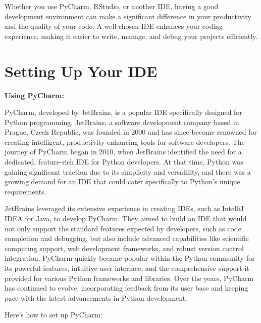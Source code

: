 \documentclass[
  letterpaper,
  DIV=11,
  numbers=noendperiod]{scrreprt}
\begin{document}
Whether you use PyCharm, RStudio, or another IDE, having a good
development environment can make a significant difference in your
productivity and the quality of your code. A well-chosen IDE enhances
your coding experience, making it easier to write, manage, and debug
your projects efficiently.

\hypertarget{setting-up-your-ide}{%
\section{Setting Up Your IDE}\label{setting-up-your-ide}}

\textbf{Using PyCharm:}

PyCharm, developed by JetBrains, is a popular IDE specifically designed
for Python programming. JetBrains, a software development company based
in Prague, Czech Republic, was founded in 2000 and has since become
renowned for creating intelligent, productivity-enhancing tools for
software developers. The journey of PyCharm began in 2010, when
JetBrains identified the need for a dedicated, feature-rich IDE for
Python developers. At that time, Python was gaining significant traction
due to its simplicity and versatility, and there was a growing demand
for an IDE that could cater specifically to Python's unique
requirements.

JetBrains leveraged its extensive experience in creating IDEs, such as
IntelliJ IDEA for Java, to develop PyCharm. They aimed to build an IDE
that would not only support the standard features expected by
developers, such as code completion and debugging, but also include
advanced capabilities like scientific computing support, web development
frameworks, and robust version control integration. PyCharm quickly
became popular within the Python community for its powerful features,
intuitive user interface, and the comprehensive support it provided for
various Python frameworks and libraries. Over the years, PyCharm has
continued to evolve, incorporating feedback from its user base and
keeping pace with the latest advancements in Python development.

Here's how to set up PyCharm:
\end{document}
